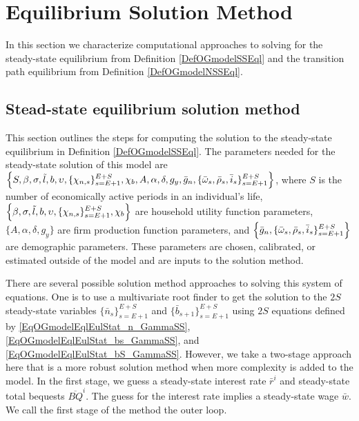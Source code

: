 \documentclass[letterpaper,12pt]{article}
\theoremstyle{definition}
\begin{document}


\section{Equilibrium Solution Method}\label{SecSolMth}

  In this section we characterize computational approaches to solving for the steady-state equilibrium from Definition \ref{DefOGmodelSSEql} and the transition path equilibrium from Definition \ref{DefOGmodelNSSEql}.


  \subsection{Stead-state equilibrium solution method}\label{SecSolMthSS}

    This section outlines the steps for computing the solution to the steady-state equilibrium in Definition \ref{DefOGmodelSSEql}. The parameters needed for the steady-state solution of this model are $\Bigl\{S, \beta, \sigma, \tilde{l}, b, \upsilon, \{\chi_{n,s}\}_{s=E+1}^{E+S}, \chi_b, A, \alpha, \delta, g_y, \bar{g}_n, \{\bar{\omega}_s,\bar{\rho}_s,\bar{i}_s\}_{s=E+1}^{E+S}\Bigr\}$, where $S$ is the number of economically active periods in an individual's life, $\Bigl\{\beta, \sigma, \tilde{l}, b, \upsilon, \{\chi_{n,s}\}_{s=E+1}^{E+S}, \chi_b\Bigr\}$ are household utility function parameters, $\{A, \alpha, \delta,g_y\}$ are firm production function parameters, and $\Bigl\{\bar{g}_n,\{\bar{\omega}_s,\bar{\rho}_s,\bar{i}_s\}_{s=E+1}^{E+S}\Bigr\}$ are demographic parameters. These parameters are chosen, calibrated, or estimated outside of the model and are inputs to the solution method.

    There are several possible solution method approaches to solving this system of equations. One is to use a multivariate root finder to get the solution to the $2S$ steady-state variables $\{\bar{n}_s\}_{s=E+1}^{E+S}$ and $\{\bar{b}_{s+1}\}_{s=E+1}^{E+S}$ using $2S$ equations defined by \eqref{EqOGmodelEqlEulStat_n_GammaSS}, \eqref{EqOGmodelEqlEulStat_bs_GammaSS}, and \eqref{EqOGmodelEqlEulStat_bS_GammaSS}. However, we take a two-stage approach here that is a more robust solution method when more complexity is added to the model. In the first stage, we guess a steady-state interest rate $\bar{r}^i$ and steady-state total bequests $\overline{BQ}^i$. The guess for the interest rate implies a steady-state wage $\bar{w}$. We call the first stage of the method the outer loop.
\end{document}
